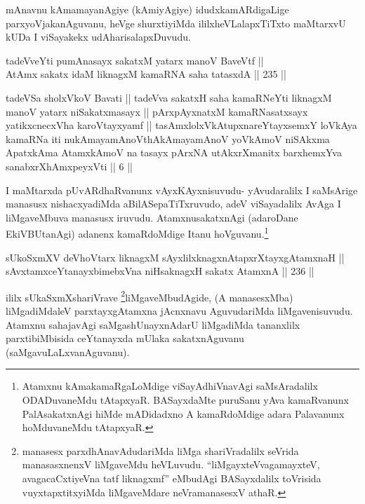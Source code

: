 \begin{artha}
mAnavnu kAmamayanAgiye (kAmiyAgiye) idudx\break kamARdigaLige
parxyoVjakanAguvanu, heVge shurxtiyiMda ililx\break heVLalapxTiTxto
maMtarxvU kUDa I viSayakekx udAharisalapxDuvudu.
\end{artha}


\begin{shl}
tadeVveYti pumAnasayx sakatxM yatarx manoV BaveVtf || \\
AtAmx sakatx idaM liknagxM kamaRNA saha tatasxdA \hfill || 235 ||  
\end{shl}

\begin{kandikeshl}
tadeVSa sholxVkoV Bavati || tadeVva sakatxH saha kamaRNeYti liknagxM manoV yatarx niSakatxmasayx || pArxpAyxnatxM kamaRNasatxsayx yatikxcnecxVha karoVtayxyamf || tasAmxlolxVkAtupxnareYtayxsemxY loVkAya kamaRNa iti nu\break kAmayamAnoV\s thAkAmayamAnoV yoV\s kAmoV niSAkxma ApatxkAma AtamxkAmoV na tasayx pArxNA utAkxrXmanitx barxhemxYva sanabxrXhAmxpeyxVti || 6 ||
\end{kandikeshl}

\begin{artha}
I maMtarxda pUvARdhaRvanunx vAyxKAyxnisuvudu- yAvudaralilx I
saMsArige manasusx nishacxyadiMda aBilASepaTiTxruvudo, adeV
viSayadalilx AvAga I liMgaveMbuva manasusx iruvudu. Atamxnu\break sakatxnAgi
(adaroDane EkiVBUtanAgi) adanenx kamaRdoMdige Itanu
hoVguvanu.\footnote{Atamxnu kAmakamaRgaLoMdige viSayAdhiVnavAgi
saMsAradalilx ODADuvaneMdu tAtapxyaR. BASayxdaMte puruSanu yAva
kamaRvanunx PalAsakatxnAgi hiMde mADidadxno A kamaRdoMdige adara
Palavanunx hoMduvaneMdu tAtapxyaR.}
\end{artha}


\begin{shl}
sUkoSxmXV deVhoV\s tarx liknagxM sAyxlilxknagxnAtapxrXtayxgAtamxnaH || \\
sAvxtamxceYtanayxbimebxVna niHsaknagxH sakatx AtamxnA \hfill || 236 ||  
\end{shl}

\begin{artha}
ililx sUkaSxmXshariVrave \footnote{manasesx parxdhAnavAdudariMda liMga
shariVradalilx seVrida manasasxnenxV liMgaveMdu heVLuvudu.
``liMgayxteV\s vagamayxteV, avagacaCxtiyeVna tatf liknagxmf'' eMbudAgi BASayxdalilx toVrisida vuyxtapxtitxyiMda
liMgaveMdare neVramanasesxV athaR.}liMgaveMbudAgide, (A manasesxMba)
liMgadiMdaleV parxtayxgAtamxna jAcnxnavu AguvudariMda liMgavenisuvudu.
Atamxnu sahajavAgi saMgashUnayxnAdarU liMgadiMda tananxlilx
parxtibiMbisida ceYtanayxda mUlaka sakatxnAguvanu
(saMgavuLaLxvanAguvanu).
\end{artha}

